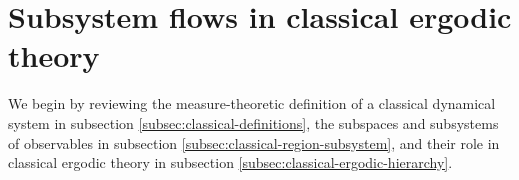 \documentclass[a4paper,11pt]{article}
\theoremstyle{definition}
\newcommand{\nn}{\nonumber}
\newcommand{\ep}{\epsilon}
\newcommand{\NL}[1]{\textcolor{blue}{#1}}
\begin{document}



\section{Subsystem flows in classical ergodic theory}\label{app:classical}


We begin by reviewing the measure-theoretic definition of a classical dynamical system in subsection \ref{subsec:classical-definitions}, the subspaces and subsystems of observables in subsection \ref{subsec:classical-region-subsystem}, and their role in classical ergodic theory in subsection \ref{subsec:classical-ergodic-hierarchy}. 
\end{document}
